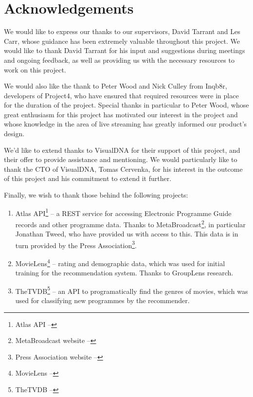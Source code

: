 \section{Acknowledgements}

We would like to express our thanks to our supervisors, David Tarrant and Les Carr, whose guidance has been extremely valuable throughout this project. We would like to thank David Tarrant for his input and suggestions during meetings and ongoing feedback, as well as providing us with the necessary resources to work on this project.

We would also like the thank to Peter Wood and Nick Culley from Inqb8r, developers of Project4, who have ensured that required resources were in place for the duration of the project. Special thanks in particular to Peter Wood, whose great enthusiasm for this project has motivated our interest in the project and whose knowledge in the area of live streaming has greatly informed our product's design.

We'd like to extend thanks to VisualDNA for their support of this project, and their offer to provide assistance and mentioning. We would particularly like to thank the CTO of VisualDNA, Tomas Cervenka, for his interest in the outcome of this project and his commitment to extend it further.

Finally, we wish to thank those behind the following projects:
\begin{enumerate}
\item Atlas API\footnote{Atlas API -- } -- a REST service for accessing Electronic Programme Guide records and other programme data. Thanks to MetaBroadcast\footnote{MetaBroadcast website -- }, in particular Jonathan Tweed, who have provided us with access to this. This data is in turn provided by the Press Association\footnote{Press Association website -- }.
\item MovieLens\footnote{MovieLens -- } -- rating and demographic data, which was used for initial training for the recommendation system. Thanks to GroupLens research.
\item TheTVDB\footnote{TheTVDB -- } -- an API to programatically find the genres of movies, which was used for classifying new programmes by the recommender.
\end{enumerate}

\cleardoublepage
\setcounter{tocdepth}{2}

\begin{comment}
	\tableofcontents
	\newpage
	\cleardoublepage
	\setcounter{page}{0}
	\pagenumbering{arabic}
	\cleardoublepage
\end{comment}

